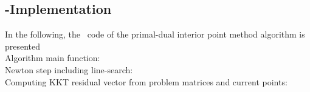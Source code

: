 \subsection{\matlab-Implementation}
In the following, the \matlab \ code of the primal-dual interior point method algorithm is presented\\

Algorithm main function:\\
{\tiny }
Newton step including line-search:\\
{\tiny }
Computing KKT residual vector from problem matrices and current points:\\
{\tiny }



